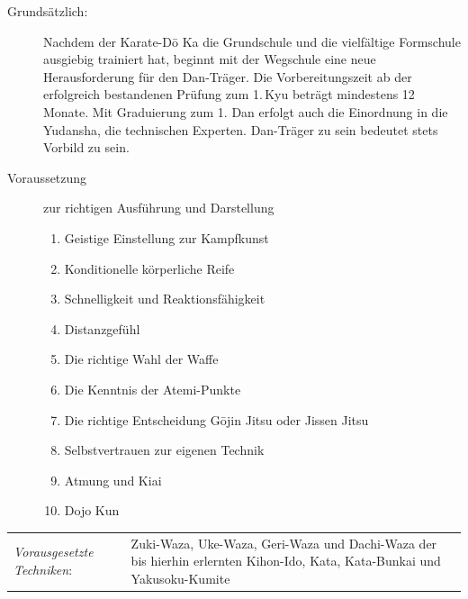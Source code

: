 	\begin{description}
	\item[Grundsätzlich:]Nachdem der Karate-D\={o} Ka die Grundschule und die vielfältige Formschule ausgiebig trainiert hat, beginnt mit der Wegschule eine neue Herausforderung für den Dan-Träger. Die Vorbereitungszeit ab der erfolgreich bestandenen Prüfung zum 1.\,Kyu beträgt mindestens 12 Monate. Mit Graduierung zum 1. Dan erfolgt auch die Einordnung in die Yudansha, die technischen Experten. Dan-Träger zu sein bedeutet stets Vorbild zu sein. 
	\item[Voraussetzung]zur richtigen Ausführung und Darstellung 
		\begin{enumerate}[nosep]
			\item Geistige Einstellung zur Kampfkunst
			\item Konditionelle körperliche Reife
			\item Schnelligkeit und Reaktionsfähigkeit
			\item Distanzgefühl
			\item Die richtige Wahl der Waffe
			\item Die Kenntnis der Atemi-Punkte
			\item Die richtige Entscheidung G\={o}jin Jitsu oder Jissen Jitsu
			\item Selbstvertrauen zur eigenen Technik
			\item Atmung und Kiai
			\item Dojo Kun
		\end{enumerate}
	\end{description}
	\renewcommand{\labelenumi}{\alph{enumi}.)}
	\renewcommand{\labelenumii}{\arabic*.}
	{\scriptsize 
	\begin{tabularx}{\textwidth}{lX}
		\textit{Vorausgesetzte Techniken}:& Zuki-Waza, Uke-Waza, Geri-Waza und Dachi-Waza der bis hierhin erlernten Kihon-Ido, Kata, Kata-Bunkai und Yakusoku-Kumite
	\end{tabularx}\\}

